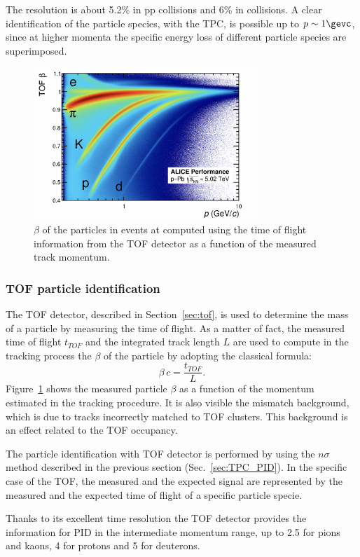 The \dedx resolution is about 5.2\% in pp collisions and 6\% in \PbPb collisions.
A clear identification of the particle species, with the TPC, is possible up to $p \sim 1 \gevc$,
since at higher momenta the specific energy loss of different particle species are superimposed.

\begin{figure} [!h]
    \centering
    \includegraphics[width=0.75\textwidth]{gfx/pid_tof}
	\caption{$\beta$ of the particles in \pPb events at \sctev computed using the time of flight information from the TOF detector as a function of the measured track momentum.}
	\label{fig:pid_tof}
\end{figure}

\subsubsection{TOF particle identification} 

The TOF detector, described in Section~\ref{sec:tof}, is used to determine the mass of a particle by
measuring the time of flight.
As a matter of fact, the measured time of flight $t_{TOF}$ and the integrated track length $L$ are used
to compute in the tracking process the $\beta$ of the particle by adopting the classical formula:
\begin{equation}
    \beta\,c = \frac{t_{TOF}}{L}.
\end{equation}
Figure~\ref{fig:pid_tof} shows the measured particle $\beta$ as a function of the momentum estimated
in the tracking procedure.
It is also visible the mismatch background, which is due to tracks incorrectly matched to TOF
clusters. This background is an effect related to the TOF occupancy.

The particle identification with TOF detector is performed by using the $n\sigma$ method described in the 
previous section (Sec.~\ref{sec:TPC_PID}). In the specific case of the TOF, the measured and the 
expected signal are represented by the measured and the expected time of flight of a specific
particle specie.

Thanks to its excellent time resolution the TOF detector provides the information for PID in the
intermediate momentum range, up to 2.5 \gevc for pions and kaons, 4 \gevc for protons and 5 \gevc
for deuterons.
